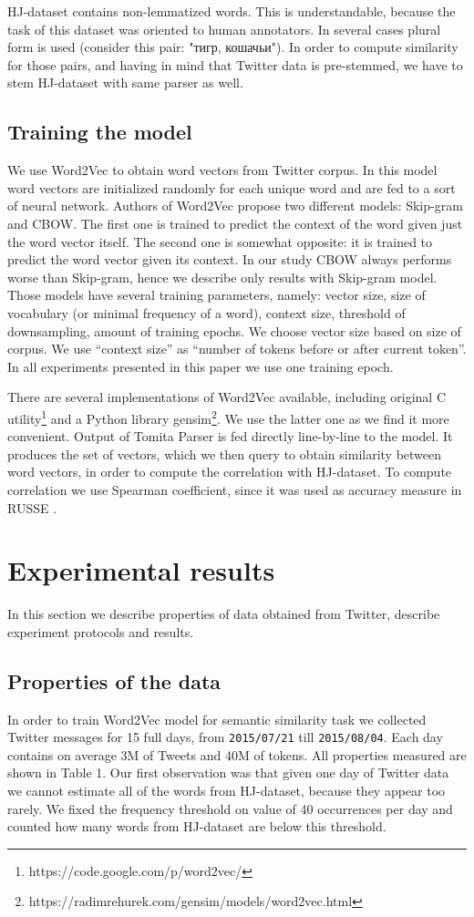 \documentclass{llncs}
\begin{document}
HJ-dataset contains non-lemmatized words. This is understandable, because the task of this dataset was oriented to human annotators. In several cases plural form is used (consider this pair: "\foreignlanguage{russian}{тигр}, \foreignlanguage{russian}{кошачьи}"). In order to compute similarity for those pairs, and having in mind that Twitter data is pre-stemmed, we have to stem HJ-dataset with same parser as well.   
%
\subsection{Training the model}
%
We use Word2Vec to obtain word vectors from Twitter corpus. In this model word vectors are initialized randomly for each unique word and are fed to a sort of neural network. Authors of Word2Vec propose two different models: Skip-gram and CBOW. The first one is trained to predict the context of the word given just the word vector itself. The second one is somewhat opposite: it is trained to predict the word vector given its context. In our study CBOW always performs worse than Skip-gram, hence we describe only results with Skip-gram model. Those models have several training parameters, namely: vector size, size of vocabulary (or minimal frequency of a word), context size, threshold of downsampling, amount of training epochs. We choose vector size based on size of corpus. We use “context size” as “number of tokens before or after current token”. In all experiments presented in this paper we use one training epoch. 

There are several implementations of Word2Vec available, including original C utility\footnote{https://code.google.com/p/word2vec/} and a Python library gensim\footnote{https://radimrehurek.com/gensim/models/word2vec.html}. We use the latter one as we find it more convenient. Output of Tomita Parser is fed directly line-by-line to the model. It produces the set of vectors, which we then query to obtain similarity between word vectors, in order to compute the correlation with HJ-dataset. To compute correlation we use Spearman coefficient, since it was used as accuracy measure in RUSSE \cite{Panchenko2015}.
%
\section{Experimental results}
%
In this section we describe properties of data obtained from Twitter, describe experiment protocols and results.
%
\subsection{Properties of the data}
In order to train Word2Vec model for semantic similarity task we collected Twitter messages for 15 full days, from {\tt2015/07/21} till {\tt2015/08/04}. Each day contains on average 3M of Tweets and 40M of tokens. All properties measured are shown in Table 1. Our first observation was that given one day of Twitter data we cannot estimate all of the words from HJ-dataset, because they appear too rarely. We fixed the frequency threshold on value of 40 occurrences per day and counted how many words from HJ-dataset are below this threshold. 
\end{document}
